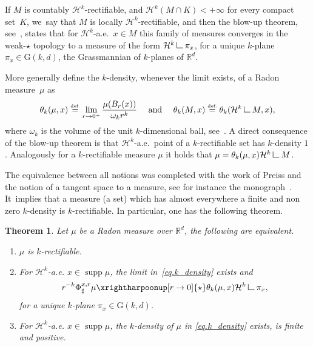 \documentclass[10pt]{amsart}
\newenvironment{enumeratei}
{\bgroup\def\theenumi{\roman{enumi}}\def\theenumii{\arabic{enumii}}\begin{enumerate}}
{\end{enumerate}\egroup}
\let\ts\textstyle
\newtheorem{theorem}{Theorem}[section]
\theoremstyle{definition}
\newcommand{\eqdef}{\ensuremath{\stackrel{\mbox{\upshape\tiny def.}}{=}}}
\newcommand\LM[1]{\hbox{\vrule width.5pt \vbox to#1pt{\vfill \hrule width#1pt height.5pt}}}
\newcommand\LL{{\mathchoice {\>\LM7\>}{\>\LM7\>}{\,\LM5\,}{\,\LM{3.35}\,}}}
\newcommand{\mres}{\LL}
\newcommand\cH{\mathcal{H}}
\newcommand{\RR}{\mathbb{R}}
\DeclareMathOperator{\supp}{supp}
\begin{document}
If $M$ is countably $\cH^k$-rectifiable, and $\cH^k(M\cap K)<+\infty$ for every compact set~$K$, we~say that $M$ is locally $\cH^k$-rectifiable, and then the blow-up theorem, see~\cite[Th.\,10.2]{maggi2012sets}, states that for $\cH^k$-a.e.\ $x \in M$ this family of measures converges in the weak-$\star$ topology to a measure of the form $\cH^k \mres \pi_x$, for a unique $k$-plane $\pi_x \in \text{G}(k,d)$, the Grassmannian of $k$-planes of $\RR^d$.

More generally define the $k$-density, whenever the limit exists, of a Radon measure~$\mu$ as
\begin{equation}\label{eq.k_density}
\theta_k(\mu,x) \eqdef \lim_{r \to 0^+}
\frac{\mu(B_r(x))}{\omega_k r^k}\quad \text{ and }\quad
\theta_k(M,x) \eqdef \theta_k(\cH^k\mres M, x),
\end{equation}
where $\omega_k$ is the volume of the unit $k$-dimensional ball, see~\cite{ambrosio2000functions,maggi2012sets}. A direct consequence of the blow-up theorem is that $\cH^k$-a.e.~point of a $k$-rectifiable set has $k$-density $1$. Analogously for a $k$-rectifiable measure $\mu$ it holds that $\mu = \theta_k(\mu, x) \cH^k\mres M$.

The equivalence between all notions was completed with the work of Preiss and the notion of a tangent space to a measure, see for instance the monograph~\cite{delellis2006lecture}. It~implies that a measure (\resp a set) which has almost everywhere a finite and non zero $k$-density is $k$-rectifiable. In particular, one has the following theorem.

\begin{theorem}\label{theorem.rectifiability_tangentiability}
Let $\mu$ be a Radon measure over $\RR^d$, the following are equivalent.
\begin{enumeratei}
\item\label{theorem.rectifiability_tangentiabilityi}
$\mu$ is $k$-rectifiable.
\item\label{theorem.rectifiability_tangentiabilityii}
For $\cH^k$-a.e. $x \in \supp \mu$, the limit in~\eqref{eq.k_density} exists and
\[
r^{-k}\Phi^{x,r}_\sharp \mu \xrightharpoonup[r \to 0]{\ts\star} 
\theta_k(\mu,x)\cH^k\mres \pi_x,
\]
for a unique $k$-plane $\pi_x \in \text{G}(k,d)$.
\item\label{theorem.rectifiability_tangentiabilityiii}
For $\cH^k$-a.e. $x \in \supp \mu$, the $k$-density of $\mu$ in \eqref{eq.k_density} exists, is finite and positive.
\end{enumeratei}
\end{theorem}
\end{document}
